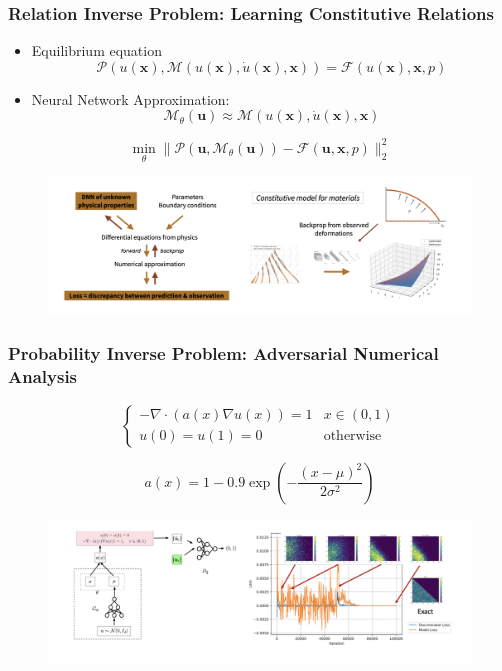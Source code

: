\documentclass{beamer}
\begin{document}
\begin{frame}
	\frametitle{Relation Inverse Problem: Learning Constitutive Relations}
	\begin{itemize}
		\item Equilibrium equation
		\begin{equation*}
		\mathcal{P}(u(\mathbf{x}), \mathcal{M}(u(\mathbf{x}),\dot u(\mathbf{x}), \mathbf{x})) = \mathcal{F}(u(\mathbf{x}), \mathbf{x}, p)
	\end{equation*}
		\item Neural Network Approximation:
		\begin{equation*}
			\mathcal{M}_{\theta}(\mathbf{u}) \approx \mathcal{M}(u(\mathbf{x}),\dot u(\mathbf{x}),\mathbf{x})
		\end{equation*}
	\end{itemize}
	
	
	\begin{equation*}
		\boxed{\min_{\theta}\|\mathcal{P}(\mathbf{u}, \mathcal{M}_{\theta}(\mathbf{u})) - \mathcal{F}(\mathbf{u}, \mathbf{x}, p) \|^2_2}
	\end{equation*}
		\begin{figure}[hbt]
	 \includegraphics[width=1.0\textwidth]{../law.png}
\end{figure}
\end{frame}

\begin{frame}
	\frametitle{Probability Inverse Problem: Adversarial Numerical Analysis}
	
		\begin{equation*}
			\begin{cases}     -\nabla \cdot (a(x)\nabla u(x)) = 1 & x\in(0,1)\\
    u(0) = u(1) = 0 & \mbox{otherwise} \end{cases}
		\end{equation*}
		
		\begin{equation*}
			a(x) = 1-0.9\exp\left( -\frac{(x-\mu)^2}{2\sigma^2} \right)
		\end{equation*}

\begin{figure}[hbt]
	 \includegraphics[width=1.0\textwidth]{../ana.png}
\end{figure}
\end{frame}
\end{document}
